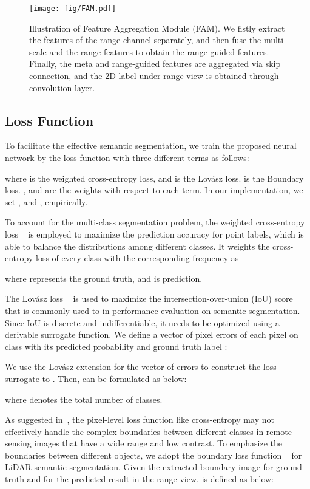 \documentclass[letterpaper, 10 pt, journal, twoside]{ieeetran}
\begin{document}
\begin{figure}
 \centering
 \setlength{\abovecaptionskip}{-0.2cm}
\texttt{[image: fig/FAM.pdf]}
    \caption{Illustration of Feature Aggregation Module (FAM). We fistly extract the features of the range channel separately, and then fuse the multi-scale and the range features to obtain the range-guided features. Finally, the meta and range-guided features are aggregated via skip connection, and the 2D label under range view is obtained through  convolution layer.}
    \label{fig:fourth}
    \vspace{-6mm}
\end{figure}

\subsection{Loss Function}
To facilitate the effective semantic segmentation, we train the proposed neural network by the loss function  with three different terms as follows:

where  is the weighted cross-entropy loss, and  is the Lov\'asz loss.  is the Boundary loss. ,  and  are the weights with respect to each term. In our implementation, we set ,  and , empirically.


To account for the multi-class segmentation problem, the weighted cross-entropy loss ~\cite{zhang2018generalized} is employed to maximize the prediction accuracy for point labels, which is able to balance the distributions among different classes. It weights the cross-entropy loss of every class with the corresponding frequency  as 

where  represents the ground truth, and  is prediction.

The Lov\'asz loss ~\cite{berman2018lovasz} is used to maximize the intersection-over-union (IoU) score that is commonly used to in performance evaluation on semantic segmentation. Since IoU is discrete and indifferentiable, it needs to be optimized using a derivable surrogate function. We define a vector of pixel errors  of each pixel  on class  with its predicted probability  and ground truth label :

We use the Lov\'asz extension \cite{berman2018lovasz} for the vector of errors  to construct the loss  surrogate to . Then,  can be formulated as below:

where  denotes the total number of classes. 

As suggested in~\cite{bokhovkin2019boundary}, the pixel-level loss function like cross-entropy may not effectively handle the complex boundaries between different classes in remote sensing images that have a wide range and low contrast. To emphasize the boundaries between different objects, we adopt the boundary loss function ~\cite{bokhovkin2019boundary} for LiDAR semantic segmentation. Given the extracted boundary image  for ground truth  and  for the predicted result  in the range view,  is defined as below:
\end{document}
